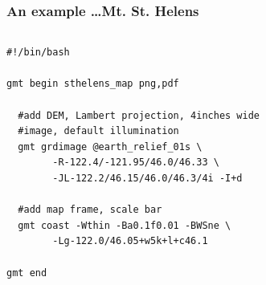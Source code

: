 \documentclass[unknownkeysallowed]{beamer}
\begin{document}
\begin{frame}[fragile=singleslide]
\frametitle{An example \dots Mt. St. Helens}
	\begin{columns}
		\tiny{
		\begin{verbatim}
#!/bin/bash

gmt begin sthelens_map png,pdf

  #add DEM, Lambert projection, 4inches wide 
  #image, default illumination
  gmt grdimage @earth_relief_01s \
        -R-122.4/-121.95/46.0/46.33 \
        -JL-122.2/46.15/46.0/46.3/4i -I+d

  #add map frame, scale bar
  gmt coast -Wthin -Ba0.1f0.01 -BWSne \
        -Lg-122.0/46.05+w5k+l+c46.1

gmt end		
		\end{verbatim}
}
		\begin{center}
		\end{center}
	\end{columns}
\end{frame}
\end{document}
